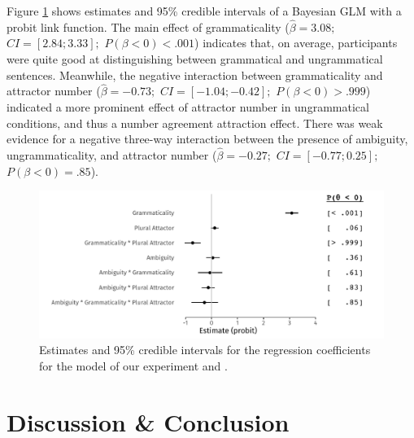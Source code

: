\documentclass[brill,linguex]{glossa}\usepackage[]{graphicx}\usepackage[]{color}
\makeatletter
\def\maxwidth{ %
  \ifdim\Gin@nat@width>\linewidth
    \linewidth
  \else
    \Gin@nat@width
  \fi
}
\newenvironment{knitrout}{}{} %
\makeatother
\begin{document}
Figure \ref{fig:ResponseModel} shows estimates and 95\% credible intervals of a Bayesian GLM with a probit link function. The main effect of grammaticality ($\hat{\beta}=3.08;$ $CI=[2.84; 3.33];$ $P(\beta<0)< .001$) indicates that, on average, participants were quite good at distinguishing between grammatical and ungrammatical sentences. Meanwhile, the negative interaction between grammaticality and attractor number ($\hat{\beta}=-0.73;$ $CI=[-1.04; -0.42];$ $P(\beta<0)> .999$) indicated a more prominent effect of attractor number in ungrammatical conditions, and thus a number agreement attraction effect. There was weak evidence for a negative three-way interaction between the presence of ambiguity, ungrammaticality, and attractor number ($\hat{\beta}=-0.27;$ $CI=[-0.77; 0.25];$ $P(\beta<0)=    .85$).


\begin{figure}[hbt!]
\centering


\begin{knitrout}
\color{fgcolor}

{\centering \includegraphics[width=\maxwidth]{figure/ResponseModel-1} 

}


\end{knitrout}

\caption{Estimates and 95\% credible intervals for the regression coefficients for the model of our experiment and \citet{LagoEtAl:2019}.}
\label{fig:ResponseModel}
\end{figure}


\section{Discussion \& Conclusion}
\end{document}
